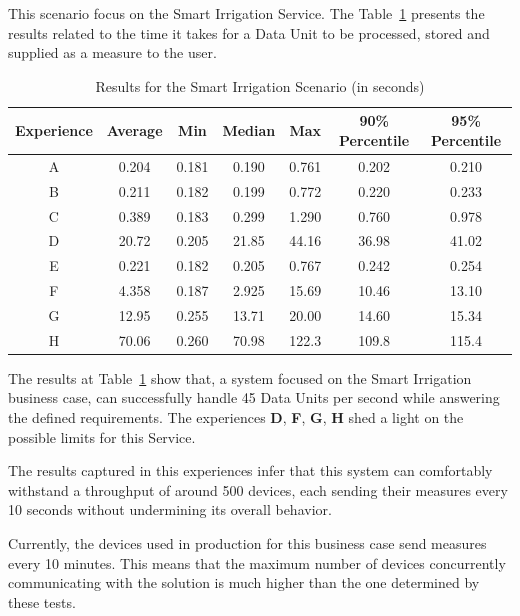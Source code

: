 This scenario focus on the Smart Irrigation Service. The Table~\ref{tab:evaluation:experiences:irrigation:results} presents the results related to the time it takes for a Data Unit to be processed, stored and supplied as a measure to the user.

\begin{table}[H]
    \caption{Results for the Smart Irrigation Scenario (in seconds)}
    \label{tab:evaluation:experiences:irrigation:results}
    \centering
    \begin{tabular}{@{}ccccccc@{}}
    \toprule
    \textbf{Experience} & \textbf{Average} & \textbf{Min} & \textbf{Median} & \textbf{Max} & \textbf{90\% Percentile} & \textbf{95\% Percentile} \\ \midrule
    A & 0.204 & 0.181 & 0.190 & 0.761 & 0.202 & 0.210 \\ \midrule
    B & 0.211 & 0.182 & 0.199 & 0.772 & 0.220 & 0.233 \\ \midrule
    C & 0.389 & 0.183 & 0.299 & 1.290 & 0.760 & 0.978 \\ \midrule
    D & 20.72 & 0.205 & 21.85 & 44.16 & 36.98 & 41.02 \\ \midrule
    E & 0.221 & 0.182 & 0.205 & 0.767 & 0.242 & 0.254 \\ \midrule
    F & 4.358 & 0.187 & 2.925 & 15.69 & 10.46 & 13.10 \\ \midrule
    G & 12.95 & 0.255 & 13.71 & 20.00 & 14.60 & 15.34 \\ \midrule
    H & 70.06 & 0.260 & 70.98 & 122.3 & 109.8 & 115.4 \\ \bottomrule
    \end{tabular}
\end{table}

The results at Table~\ref{tab:evaluation:experiences:irrigation:results} show that, a system focused on the Smart Irrigation business case, can successfully handle 45 Data Units per second while answering the defined requirements. The experiences \textbf{D}, \textbf{F}, \textbf{G}, \textbf{H} shed a light on the possible limits for this Service.

The results captured in this experiences infer that this system can comfortably withstand a throughput of around 500 devices, each sending their measures every 10 seconds without undermining its overall behavior.

Currently, the devices used in production for this business case send measures every 10 minutes. This means that the maximum number of devices concurrently communicating with the solution is much higher than the one determined by these tests.

